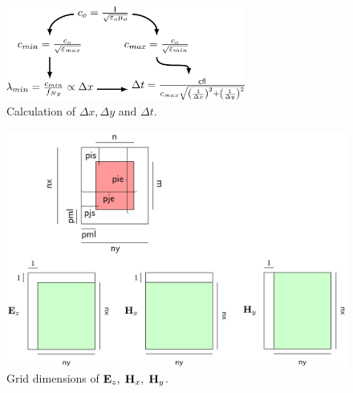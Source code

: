 \documentclass[a4paper,12pt]{article}
\begin{document}
%
\begin{figure}
\centering
\includegraphics[width=0.7\textwidth]{../pics/tikz/dx-dy-dt.pdf}
\caption{Calculation of $\Delta x, \Delta y$ and $\Delta t$.}
\end{figure}
%
\begin{figure}
\centering
\includegraphics[width=1\textwidth]{../pics/tikz/svg/EzHxHy.pdf}
\caption{Grid dimensions of ${\bf E}_z,\; {\bf H}_x,\; {\bf H}_y$.}
\end{figure}
%
\end{document}

